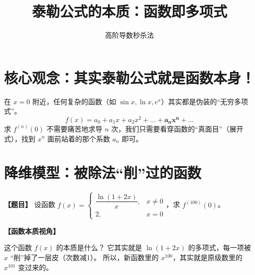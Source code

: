 \documentclass[UTF8, a4paper, 12pt]{article}
\title{\textbf{泰勒公式的本质：函数即多项式}}
\author{高阶导数秒杀法}
\date{}
\newenvironment{essence}{
    \par\vspace{0.5em}\noindent
    \textbf{\color{purple}【函数本质视角】}
    \itshape
}{
    \par\vspace{0.5em}
}
\begin{document}
\maketitle

\section*{核心观念：其实泰勒公式就是函数本身！}

在 $x=0$ 附近，任何复杂的函数（如 $\sin x, \ln x, e^x$）其实都是伪装的“无穷多项式”。
\[
f(x) = a_0 + a_1 x + a_2 x^2 + \dots + \mathbf{a_n x^n} + \dots
\]
求 $f^{(n)}(0)$ 不需要痛苦地求导 $n$ 次，我们只需要看穿函数的“真面目”（展开式），找到 $x^n$ 面前站着的那个系数 $a_n$ 即可。

\begin{center}
\end{center}

\vspace{1em}
\hrulefill
\vspace{1em}

\section{降维模型：被除法“削”过的函数}

\textbf{【题目】}
设函数 $ f(x) = \begin{cases} \dfrac{\ln(1+2x)}{x}, & x \neq 0 \\ 2, & x=0 \end{cases} $，求 $ f^{(100)}(0) $。

\begin{essence}
这个函数 $f(x)$ 的本质是什么？
它其实就是 $\ln(1+2x)$ 的多项式，每一项被 $x$ “削”掉了一层皮（次数减1）。
所以，新函数里的 $x^{100}$，其实就是原级数里的 $x^{101}$ 变过来的。
\end{essence}
\end{document}

